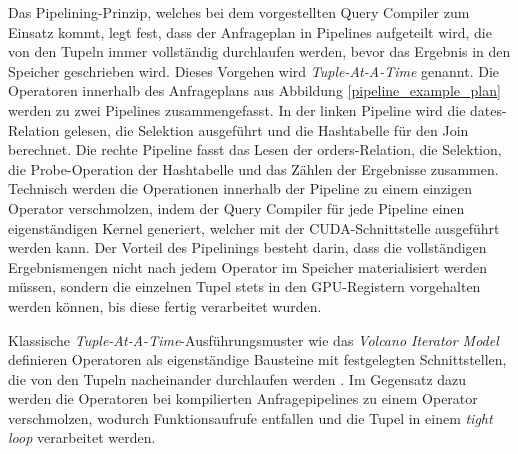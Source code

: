 Das Pipelining-Prinzip, welches bei dem vorgestellten Query Compiler zum Einsatz kommt, legt fest, dass der Anfrageplan in Pipelines aufgeteilt wird, die von den Tupeln immer vollständig durchlaufen werden, bevor das Ergebnis in den Speicher geschrieben wird.
Dieses Vorgehen wird \emph{Tuple-At-A-Time} genannt.
Die Operatoren innerhalb des Anfrageplans aus Abbildung \ref{pipeline_example_plan} werden zu zwei Pipelines zusammengefasst.
In der linken Pipeline wird die \textsf{dates}-Relation gelesen, die Selektion ausgeführt und die Hashtabelle für den Join berechnet.
Die rechte Pipeline fasst das Lesen der \textsf{orders}-Relation, die Selektion, die Probe-Operation der Hashtabelle und das Zählen der Ergebnisse zusammen.
Technisch werden die Operationen innerhalb der Pipeline zu einem einzigen Operator verschmolzen, indem der Query Compiler für jede Pipeline einen eigenständigen Kernel generiert, welcher mit der CUDA-Schnittstelle ausgeführt werden kann.
Der Vorteil des Pipelinings besteht darin, dass die vollständigen Ergebnismengen nicht nach jedem Operator im Speicher materialisiert werden müssen, sondern die einzelnen Tupel stets in den GPU-Registern vorgehalten werden können, bis diese fertig verarbeitet wurden.

Klassische \emph{Tuple-At-A-Time}-Ausführungsmuster wie das \emph{Volcano Iterator Model} definieren Operatoren als eigenständige Bausteine mit festgelegten Schnittstellen, die von den Tupeln nacheinander durchlaufen werden \cite{Graefe1994}.
Im Gegensatz dazu werden die Operatoren bei kompilierten Anfragepipelines zu einem Operator verschmolzen, wodurch Funktionsaufrufe entfallen und die Tupel in einem \emph{tight loop} \cite{Neumann2011} verarbeitet werden.

